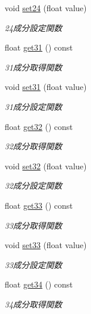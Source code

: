 \begin{DoxyCompactItemize}
void \mbox{\hyperlink{class_matrix_a99120cc734398118f0708daa95ca545b}{set24}} (float value)
\begin{DoxyCompactList}\small\item\em 24成分設定関数 \end{DoxyCompactList}\item 
float \mbox{\hyperlink{class_matrix_ad6b745b0d0b3602fb3bb2bcadba85bad}{get31}} () const
\begin{DoxyCompactList}\small\item\em 31成分取得関数 \end{DoxyCompactList}\item 
void \mbox{\hyperlink{class_matrix_a625ed38d8c5e8d20cdd399a5afd61c45}{set31}} (float value)
\begin{DoxyCompactList}\small\item\em 31成分設定関数 \end{DoxyCompactList}\item 
float \mbox{\hyperlink{class_matrix_a99786d344646aacf1391118e1968850b}{get32}} () const
\begin{DoxyCompactList}\small\item\em 32成分取得関数 \end{DoxyCompactList}\item 
void \mbox{\hyperlink{class_matrix_a3cc8c6612366d92b7b8a81f7f802f50c}{set32}} (float value)
\begin{DoxyCompactList}\small\item\em 32成分設定関数 \end{DoxyCompactList}\item 
float \mbox{\hyperlink{class_matrix_a82d71b38d75c903207dc314262c910ad}{get33}} () const
\begin{DoxyCompactList}\small\item\em 33成分取得関数 \end{DoxyCompactList}\item 
void \mbox{\hyperlink{class_matrix_ae4817d20e03fe01105b6e4957d49060e}{set33}} (float value)
\begin{DoxyCompactList}\small\item\em 33成分設定関数 \end{DoxyCompactList}\item 
float \mbox{\hyperlink{class_matrix_a544b0203b2d6656f45696f2c8f1af8cc}{get34}} () const
\begin{DoxyCompactList}\small\item\em 34成分取得関数 \end{DoxyCompactList}\item 

\end{DoxyCompactItemize}
